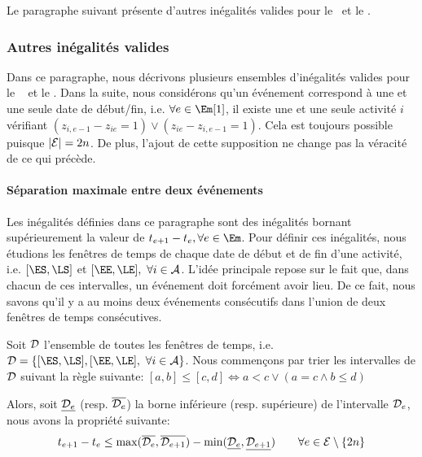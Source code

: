 Le paragraphe suivant présente d'autres inégalités valides pour le
\CECSP~et le \RCPSP. 

\subsubsection{Autres inégalités valides}

\label{sec:maxDist}
Dans ce paragraphe, nous décrivons plusieurs ensembles d'inégalités
valides pour le \RCPSP~ et le \CECSP. Dans la suite, nous considérons
qu'un événement correspond à une et une seule date de début/fin,
i.e. $\forall e \in \Em[1]$, il existe une et une seule activité $i$
vérifiant $(z_{i,e-1}-z_{ie}=1) \vee (z_{ie}-z_{i,e-1}=1)$. Cela est
toujours possible puisque $|{\cal E}|=2n$. De plus, l'ajout de cette
supposition ne change pas la véracité de ce qui précède. 

\paragraph{Séparation maximale entre deux événements} 
Les inégalités définies dans ce paragraphe sont des inégalités bornant
supérieurement la valeur de $t_{e+1}- t_e, \forall e\in \Em$. Pour
définir ces inégalités, nous étudions les fenêtres de temps de chaque
date de début et de fin d'une activité, i.e. $[\ES,\LS]$ et
$[\EE,\LE],\ \forall i \in \A$. L'idée principale repose sur le fait
que, dans chacun de ces intervalles, un événement doit forcément avoir
lieu. De ce fait, nous savons qu'il y a au moins deux événements
consécutifs dans l'union de deux fenêtres de temps consécutives. 

Soit ${\cal D}$ l'ensemble de toutes les fenêtres de temps, i.e. ${\cal
D}=\{[\ES,\LS] , [\EE,\LE],\ \forall i \in \A\}$. Nous commençons par
trier les intervalles de $\cal D$ suivant la règle suivante: 
$[a,b] \le [c,d]
\Leftrightarrow a<c \lor \left( a=c \land b\le d\right)$

Alors, soit $\underline{{\cal D}_e}$ (resp. $\overline{{\cal D}_e}$)
la borne inférieure (resp. supérieure) de l'intervalle ${\cal D}_e$,
nous avons la propriété suivante:
\begin{equation} \label{sep_CECSP_OO} 
t_{e+1}-t_e \le \max(\overline{{\cal D}_e},\overline{{\cal D}_{e+1}}) -
\min(\underline{{\cal D}_e},\underline{{\cal D}_{e+1}}) \qquad \forall e \in {\cal E}\setminus\{2n\}
\end{equation}

